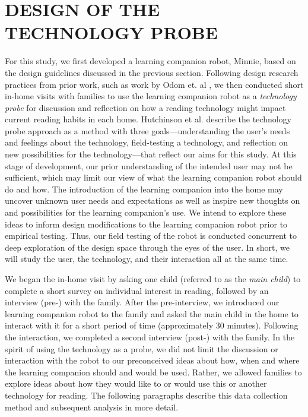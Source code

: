 \documentclass{sigchi}
\begin{document}

\section{DESIGN OF THE TECHNOLOGY PROBE}
 For this study, we first developed a learning companion robot, Minnie, based on the design guidelines discussed in the previous section. Following design research practices from prior work, such as work by Odom et. al \cite{Odom:2012}, we then conducted short in-home visits with families to use the learning companion robot as a \textit{technology probe} \cite{Hutchinson:2003} for discussion and reflection on how a reading technology might impact current reading habits in each home. Hutchinson et al. \cite{Hutchinson:2003} describe the technology probe approach as a method with three goals---understanding the user's needs and feelings about the technology, field-testing a technology, and reflection on new possibilities for the technology---that reflect our aims for this study. At this stage of development, our prior understanding of the intended user may not be sufficient, which may limit our view of what the learning companion robot should do and how. The introduction of the learning companion into the home may uncover unknown user needs and expectations as well as inspire new thoughts on and possibilities for the learning companion's use. We intend to explore these ideas to inform design modifications to the learning companion robot prior to empirical testing. Thus, our field testing of the robot is conducted concurrent to deep exploration of the design space through the eyes of the user. In short, we will study the user, the technology, and their interaction all at the same time.

 
We began the in-home visit by asking one child (referred to as the \textit{main child}) to complete a short survey on individual interest in reading, followed by an interview (pre-) with the family. After the pre-interview, we introduced our learning companion robot to the family and asked the main child in the home to interact with it for a short period of time (approximately 30 minutes). Following the interaction, we completed a second interview (post-) with the family. In the spirit of using the technology as a probe, we did not limit the discussion or interaction with the robot to our preconceived ideas about how, when and where the learning companion should and would be used. Rather, we allowed families to explore ideas about how they would like to or would use this or another technology for reading. The following paragraphs describe this data collection method and subsequent analysis in more detail.
 
\end{document}
